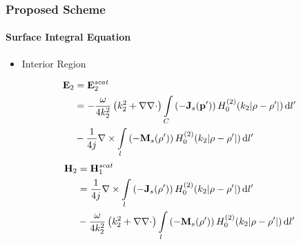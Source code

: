 \documentclass[mathserif,18pt,xcolor=table]{beamer}
\begin{document}
\begin{frame}
\frametitle{Proposed Scheme}
\framesubtitle{Surface Integral Equation}
\vspace*{-.4cm}
\begin{itemize}
  \item{Interior Region}
\end{itemize}
\begin{equation} \nonumber
  \begin{split}
    \mathbf{E}_2 &= \mathbf{E}_2^{scat} \\
    &=  -\frac{\omega}{4 k_2^2} \left( k_2^2 + \nabla \nabla \cdot \right) \int\limits_{C} \left(-\mathbf{J}_s(\mathbf{p}')\right) H_0^{(2)}(k_2 |\mathbf{\rho} - \mathbf{\rho}'|) \mathop{}\!\mathrm{d}{l'} \\
    &- \frac{1}{4 j} \nabla \times \int\limits_{l} \left(-\mathbf{M}_s(\mathbf{\rho}')\right) H_0^{(2)}(k_2 |\mathbf{\rho} - \mathbf{\rho}'|) \mathop{}\!\mathrm{d}{l'}
  \end{split}
  \label{eq:E1sc}
\end{equation}
\begin{equation} \nonumber
  \begin{split}
    \mathbf{H}_2 &= \mathbf{H}_1^{scat} \\
    &= \frac{1}{4 j} \nabla \times \int\limits_{l} \left(-\mathbf{J}_s(\mathbf{\rho}')\right) H_0^{(2)}(k_2 |\mathbf{\rho} - \mathbf{\rho}'|) \mathop{}\!\mathrm{d}{l'} \\
    &-\frac{\omega}{4 k_2^2} \left( k_2^2 + \nabla \nabla \cdot \right) \int\limits_{l} \left(-\mathbf{M}_s(\mathbf{\rho}')\right) H_0^{(2)}(k_2 |\mathbf{\rho} - \mathbf{\rho}'|) \mathop{}\!\mathrm{d}{l'}
  \end{split}
  \label{eq:H1sc}
\end{equation}
\end{frame}
\end{document}
